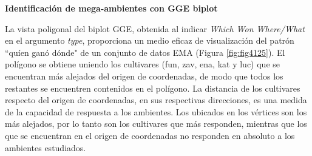 

\textbf{Identificación de mega-ambientes con GGE biplot}

La vista poligonal del biplot GGE, obtenida al indicar \emph{Which Won Where/What} en el argumento \emph{type}, proporciona un medio eficaz de visualización del patrón ``quíen ganó dónde" de un conjunto de datos EMA (Figura \ref{fig:fig4125}).  El polígono se obtiene uniendo los cultivares (fun, zav, ena, kat y luc) que se encuentran más alejados del origen de coordenadas, de modo que todos los restantes se encuentren contenidos en el polígono. La distancia de los cultivares respecto del origen de coordenadas, en sus respectivas direcciones, es una medida de la capacidad de respuesta a los ambientes. Los ubicados en los vértices son los más alejados, por lo tanto son los cultivares que más responden, mientras que los que se encuentran en el origen de coordenadas no responden en absoluto a los ambientes estudiados.

